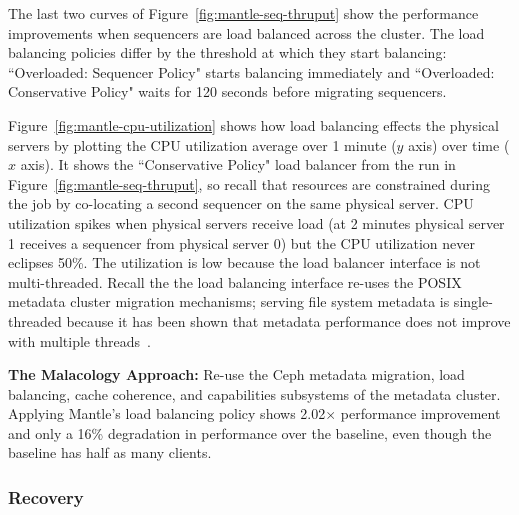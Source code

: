 \documentclass[preprint]{sigplanconf-eurosys}
\begin{document}
The last two curves of Figure~\ref{fig:mantle-seq-thruput} show the performance
improvements when sequencers are load balanced across the cluster.
The load balancing policies differ by the threshold at which they start balancing:
``Overloaded: Sequencer Policy" starts balancing immediately and ``Overloaded: Conservative
Policy" waits for 120 seconds before migrating sequencers.


Figure~\ref{fig:mantle-cpu-utilization} shows how load balancing effects the
physical servers by plotting the CPU utilization average over 1 minute (\(y\)
axis) over time (\(x\) axis).  It shows the ``Conservative Policy" load
balancer from the run in Figure~\ref{fig:mantle-seq-thruput}, so recall that
resources are constrained during the job by co-locating a second sequencer on
the same physical server.  CPU utilization spikes when physical servers receive
load (at 2 minutes physical server 1 receives a sequencer from physical server
0) but the CPU utilization never eclipses 50\%. The utilization is low because
the load balancer interface is not multi-threaded.  Recall the the load
balancing interface re-uses the POSIX metadata cluster migration mechanisms;
serving file system metadata is single-threaded because it has been shown that
metadata performance does not improve with multiple
threads~\cite{konstantinos:pdsw2014-lustre-metadata}. 

\textbf{The Malacology Approach:} Re-use the Ceph metadata migration, load
balancing, cache coherence, and capabilities subsystems of the metadata
cluster. Applying Mantle's load balancing policy shows 2.02\(\times\)
performance improvement and only a 16\% degradation in performance over the
baseline, even though the baseline has half as many clients.

\subsubsection{Recovery}
\end{document}
